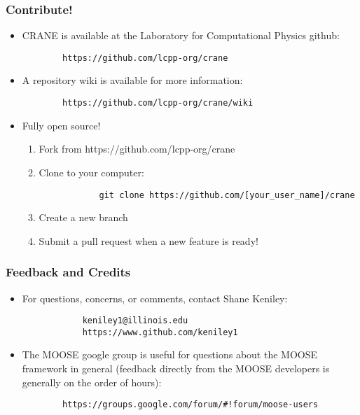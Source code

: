 \begin{frame}[fragile]
	\frametitle{Contribute!}
	\begin{itemize}
		\item CRANE is available at the Laboratory for Computational Physics github: 
		\begin{verbatim}		
		https://github.com/lcpp-org/crane
		\end{verbatim}
		\item A repository wiki is available for more information:
		\begin{verbatim}
		https://github.com/lcpp-org/crane/wiki
		\end{verbatim}
		\item Fully open source!
		\begin{enumerate}
			\item Fork from https://github.com/lcpp-org/crane
			\item Clone to your computer: 
			\begin{verbatim}
			git clone https://github.com/[your_user_name]/crane
			\end{verbatim}
			\item Create a new branch
			\item Submit a pull request when a new feature is ready!
		\end{enumerate}
	\end{itemize}
\end{frame}

\begin{frame}[fragile]
	\frametitle{Feedback and Credits}
	\begin{itemize}
		\item For questions, concerns, or comments, contact Shane Keniley:
		\begin{verbatim}
			keniley1@illinois.edu
			https://www.github.com/keniley1
		\end{verbatim}
		\item The MOOSE google group is useful for questions about the MOOSE framework in general (feedback directly from the MOOSE developers is generally on the order of hours):
		\begin{verbatim}
		https://groups.google.com/forum/#!forum/moose-users
		\end{verbatim}
	\end{itemize}
\end{frame}
